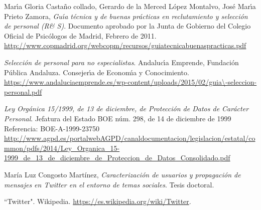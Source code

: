 
\begin{thebibliography}{3}

Mar\'\i a Gloria Casta\~no collado, Gerardo de la Merced L\'opez Montalvo, Jos\'e Mar\'\i a Prieto Zamora,
\textit{Gu\'\i a t\'ecnica y de buenas pr\'acticas en reclutamiento y selecci\'on de personal (R\& S)}.
Documento aprobado por la Junta de Gobierno del Colegio Oficial de Psicólogos de Madrid, Febrero de 2011.
\url{http://www.copmadrid.org/webcopm/recursos/guiatecnicabuenaspracticas.pdf}

\textit{Selecci\'on de personal para no especialistas}.
Andaluc\'\i a Emprende, Fundaci\'on P\'ublica Andaluza. Consejer\'\i a de Econom\'\i a y Conocimiento.
\url{https://www.andaluciaemprende.es/wp-content/uploads/2015/02/guia\-seleccion-personal.pdf}

\textit{Ley Orgánica 15/1999, de 13 de diciembre, de Protección de Datos
de Carácter Personal}.
Jefatura del Estado BOE núm. 298, de 14 de diciembre de 1999
Referencia: BOE-A-1999-23750
\url{http://www.agpd.es/portalwebAGPD/canaldocumentacion/legislacion/estatal/common/pdfs/2014/Ley_Organica_15-1999_de_13_de_diciembre_de_Proteccion_de_Datos_Consolidado.pdf}

María Luz Congosto Martínez,
\textit{Caracterización de usuarios y propagación de mensajes en Twitter en el entorno de temas sociales}.
Tesis doctoral.

``Twitter". Wikipedia. \url{https://es.wikipedia.org/wiki/Twitter}.

\end{thebibliography}